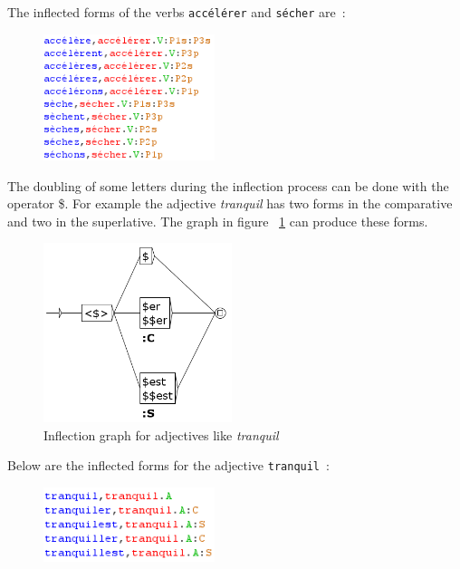 \newpage
\noindent
The inflected forms of the verbs \verb+accélérer+ and \verb+sécher+ are~:

\begin{figure}[!ht]
\begin{center}
\includegraphics[width=5cm]{resources/img/fig3-flexion_secher.png}
\end{center}
\end{figure}

\bigskip
\noindent
The doubling of some letters during the inflection process can be done with the operator \$.
For example the adjective {\it tranquil} has two forms in the comparative and two in the 
superlative. The graph in figure ~\ref{fig-inflection-tranquil} can produce these forms.

\bigskip
\begin{figure}[!ht]
\begin{center}
\includegraphics[width=5.5cm]{resources/img/fig3-Advanced_operators_with_Variables-A_tranquil.png}
\caption{Inflection graph for adjectives like {\it tranquil}
\label{fig-inflection-tranquil}}
\end{center}
\end{figure}

\noindent Below are the inflected forms for the adjective \verb+tranquil+~:

\bigskip
\begin{figure}[!ht]
\begin{center}
\includegraphics[width=5cm]{resources/img/fig3-flexion_tranquil.png}
\end{center}
\end{figure}

